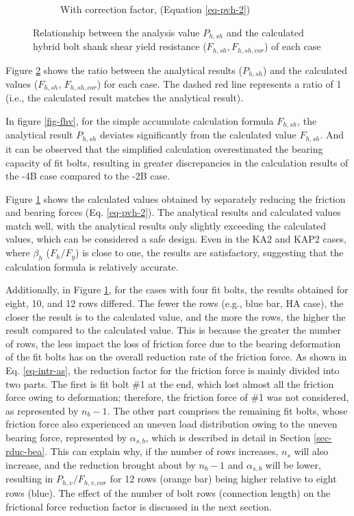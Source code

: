 \begin{figure}
\begin{subfigure}[b]{0.45\textwidth}
        \caption{With correction factor, (Equation \ref{eq-pvh-2})}
        \label{fig-fhv-cor2}
    \end{subfigure}
    \caption{Relationship between the analysis value $P_{h,sh}$ and the calculated hybrid bolt shank shear yield resistance ($F_{h,sh}, F_{h,sh,cor}$) of each case}
    \label{fig-fhv-total}
\end{figure}

 Figure \ref{fig-fhv-total} shows the ratio between the analytical results ($P_{h,sh}$) and the calculated values ($F_{h,sh}$, $F_{h,sh,cor}$) for each case. The dashed red line represents a ratio of 1 (i.e., the calculated result matches the analytical result). 

In figure \ref{fig-fhv}, for the simple accumulate calculation formula $F_{h,sh}$, the analytical result $P_{h,sh}$ deviates significantly from the calculated value $F_{h,sh}$. And it can be observed that the simplified calculation overestimated the bearing capacity of fit bolts, resulting in greater discrepancies in the calculation results of the -4B case compared to the -2B case.


Figure \ref{fig-fhv-cor2} shows the calculated values obtained by separately reducing the friction and bearing forces (Eq. \ref{eq-pvh-2}). The analytical results and calculated values match well, with the analytical results only slightly exceeding the calculated values, which can be considered a safe design. Even in the KA2 and KAP2 cases, where $\beta_h$ ($F_h/F_y$) is close to one, the results are satisfactory, suggesting that the calculation formula is relatively accurate.

Additionally, in Figure \ref{fig-fhv-cor2}, for the cases with four fit bolts, the results obtained for eight, 10, and 12 rows differed. The fewer the rows (e.g., blue bar, HA case), the closer the result is to the calculated value, and the more the rows, the higher the result compared to the calculated value. This is because the greater the number of rows, the less impact the loss of friction force due to the bearing deformation of the fit bolts has on the overall reduction rate of the friction force. As shown in Eq. \ref{eq-intr-as}, the reduction factor for the friction force is mainly divided into two parts. The first is fit bolt \#1 at the end, which lost almost all the friction force owing to deformation; therefore, the friction force of \#1 was not considered, as represented by $n_b-1$. The other part comprises the remaining fit bolts, whose friction force also experienced an uneven load distribution owing to the uneven bearing force, represented by $\alpha_{s,b}$, which is described in detail in Section \ref{sec-rduc-bea}. This can explain why, if the number of rows increases, $n_s$ will also increase, and the reduction brought about by $n_b-1$ and $\alpha_{s,b}$ will be lower, resulting in $P_{h,v}/F_{h,v,cor}$ for 12 rows (orange bar) being higher relative to eight rows (blue). The effect of the number of bolt rows (connection length) on the frictional force reduction factor is discussed in the next section.

